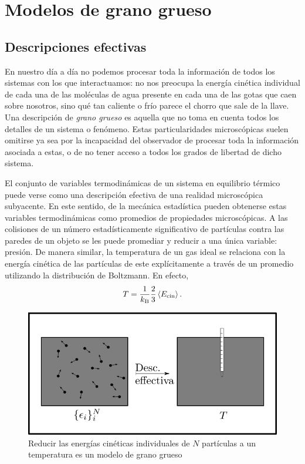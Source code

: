 \section{Modelos de grano grueso}\label{sec:Ch1CG}

\subsection{Descripciones efectivas}



En nuestro día a día no podemos procesar toda la información de todos los sistemas con los que interactuamos: no nos preocupa la energía cinética individual de cada una de las moléculas de agua presente en cada una de las gotas que caen sobre nosotros, sino qué tan caliente o frío parece el chorro que sale de la llave. Una descripción de \textit{grano grueso} es aquella que no toma en cuenta todos los detalles de un sistema o fenómeno. Estas particularidades microscópicas suelen omitirse ya sea por la incapacidad del observador de procesar toda la información asociada a estas, o de no tener acceso a todos los grados de libertad de dicho sistema.

El conjunto de variables termodinámicas de un sistema en equilibrio térmico puede verse como una descripción efectiva de una realidad microscópica subyacente. En este sentido, de la mecánica estadística pueden obtenerse estas variables termodinámicas como promedios de propiedades microscópicas. A las colisiones de un número estadísticamente significativo de partículas contra las paredes de un objeto se les puede promediar y reducir a una única variable: presión. De manera similar, la temperatura de un gas ideal se relaciona con la energía cinética de las partículas de este explícitamente a través de un promedio utilizando la distribución de Boltzmann. En efecto, 
\begin{equation}
    T=\frac{1}{k_\text{B}}\frac{2}{3}\expval{E_{\text{cin}}}.
\end{equation}
\begin{figure}[ht]
    \centering
    \includegraphics[width=0.6\linewidth]{chapter1/figures/CGT.png}
    \caption{Reducir las energías cinéticas individuales de $N$ partículas a un temperatura es un modelo de grano grueso}
    \label{fig:KtoT}
\end{figure}

